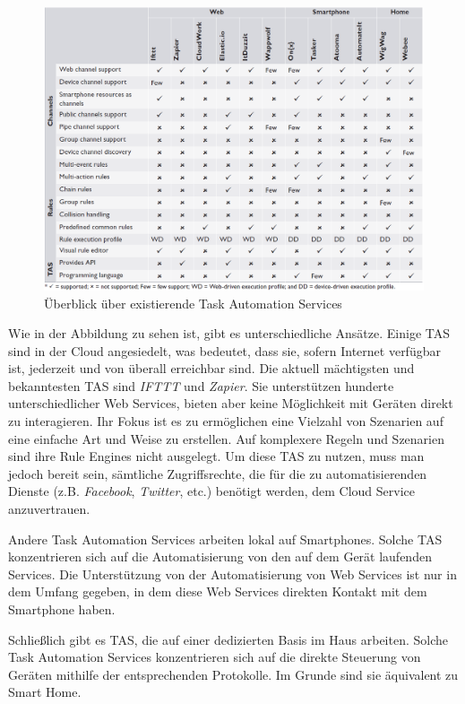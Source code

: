 \begin{figure}[h]
	\centering
	\includegraphics[width=\textwidth]{bilder/TASOverview}
	\caption{Überblick über existierende Task Automation Services \cite{ieee:tas}}
	\label{fig:tasoverview}
\end{figure}

Wie in der Abbildung zu sehen ist, gibt es unterschiedliche Ansätze. Einige TAS sind in der Cloud angesiedelt, was bedeutet, dass sie, sofern Internet verfügbar ist, jederzeit und von überall erreichbar sind. Die aktuell mächtigsten und bekanntesten TAS sind \textit{IFTTT} \cite{IFTTT} und \textit{Zapier}\cite{Zapier}. Sie unterstützen hunderte unterschiedlicher Web Services, bieten aber keine Möglichkeit mit Geräten direkt zu interagieren. Ihr Fokus ist es zu ermöglichen eine Vielzahl von Szenarien auf eine einfache Art und Weise zu erstellen. Auf komplexere Regeln und Szenarien sind ihre Rule Engines nicht ausgelegt. 
Um diese TAS zu nutzen, muss man jedoch bereit sein, sämtliche Zugriffsrechte, die für die zu automatisierenden Dienste (z.B. \textit{Facebook}, \textit{Twitter}, etc.) benötigt werden, dem Cloud Service anzuvertrauen.

Andere Task Automation Services arbeiten lokal auf Smartphones. Solche TAS konzentrieren sich auf die Automatisierung von den auf dem Gerät laufenden Services. Die Unterstützung von der Automatisierung von Web Services ist nur in dem Umfang gegeben, in dem diese Web Services direkten Kontakt mit dem Smartphone haben.  

Schließlich gibt es TAS, die auf einer dedizierten Basis im Haus arbeiten. Solche Task Automation Services konzentrieren sich auf die direkte Steuerung von Geräten mithilfe der entsprechenden Protokolle. Im Grunde sind sie äquivalent zu Smart Home. 

